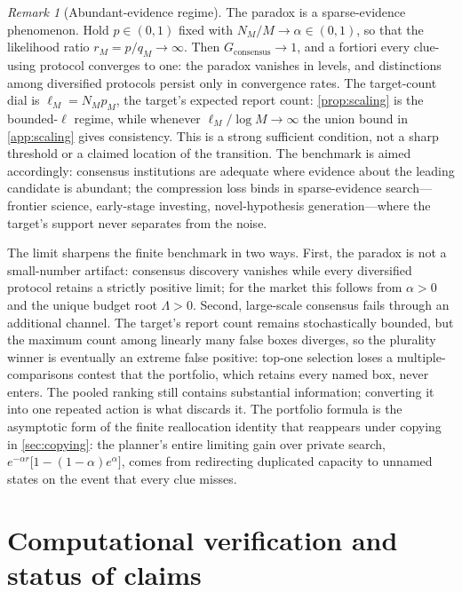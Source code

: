 \documentclass[11pt]{article}
\theoremstyle{definition}
\theoremstyle{remark}
\newtheorem{remark}{Remark}
\newcommand{\1}{\mathbf{1}}
\newcommand{\cons}{\mathrm{consensus}}
\begin{document}
\begin{remark}[Abundant-evidence regime]
\label{rem:abundant}
The paradox is a sparse-evidence phenomenon. Hold $p\in(0,1)$ fixed with $N_M/M\to\alpha\in(0,1)$, so that the likelihood ratio $r_M=p/q_M\to\infty$. Then $G_{\cons}\to1$, and a fortiori every clue-using protocol converges to one: the paradox vanishes in levels, and distinctions among diversified protocols persist only in convergence rates. The target-count dial is $\ell_M=N_Mp_M$, the target's expected report count: \cref{prop:scaling} is the bounded-$\ell$ regime, while whenever $\ell_M/\log M\to\infty$ the union bound in \cref{app:scaling} gives consistency. This is a strong sufficient condition, not a sharp threshold or a claimed location of the transition. The benchmark is aimed accordingly: consensus institutions are adequate where evidence about the leading candidate is abundant; the compression loss binds in sparse-evidence search---frontier science, early-stage investing, novel-hypothesis generation---where the target's support never separates from the noise.
\end{remark}

The limit sharpens the finite benchmark in two ways. First, the paradox is not a small-number artifact: consensus discovery vanishes while every diversified protocol retains a strictly positive limit; for the market this follows from $\alpha>0$ and the unique budget root $\Lambda>0$. Second, large-scale consensus fails through an additional channel. The target's report count remains stochastically bounded, but the maximum count among linearly many false boxes diverges, so the plurality winner is eventually an extreme false positive: top-one selection loses a multiple-comparisons contest that the portfolio, which retains every named box, never enters. The pooled ranking still contains substantial information; converting it into one repeated action is what discards it. The portfolio formula is the asymptotic form of the finite reallocation identity that reappears under copying in \cref{sec:copying}: the planner's entire limiting gain over private search, $e^{-\alpha r}\bigl[1-(1-\alpha)e^{\alpha}\bigr]$, comes from redirecting duplicated capacity to unnamed states on the event that every clue misses.

\section{Computational verification and status of claims}
\label{app:computation}
\end{document}
